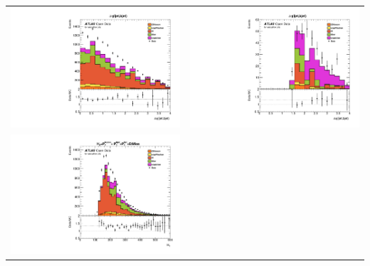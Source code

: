 \documentclass[10pt]{beamer}
\begin{document}
\begin{frame}
\begin{center}
	\begin{tabular}{cc}
		
		\includegraphics[scale=0.22]{dif} &
		
		\includegraphics[scale=0.22]{dif_cuts} \\
		
		\includegraphics[scale=0.22]{Ht} &
		

\end{tabular}
\end{center}
\end{frame}
\end{document}
